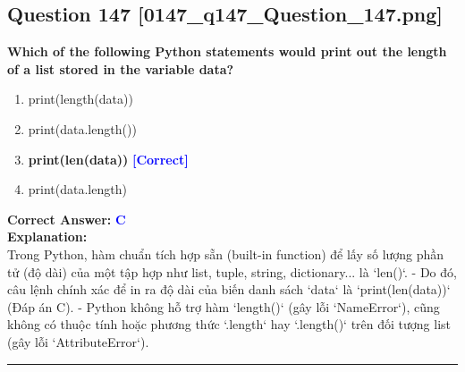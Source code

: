 \documentclass[11pt,a4paper]{article}
\begin{document}
\begin{minipage}{\textwidth}
\subsection*{Question 147 \quad \footnotesize{[0147_q147_Question_147.png]}}
\noindent \textbf{Which of the following Python statements would print out the length of a list stored in the variable data?}

\begin{enumerate}[label=\Alph*.]
    \item print(length(data))
    \item print(data.length())
    \item \textbf{print(len(data))} \hfill \textcolor{blue}{\textbf{[Correct]}}
    \item print(data.length)
\end{enumerate}

\noindent \textbf{Correct Answer:} \textcolor{blue}{\textbf{C}} \\[4pt]
\noindent \textbf{Explanation:}\\
Trong Python, hàm chuẩn tích hợp sẵn (built-in function) để lấy số lượng phần tử (độ dài) của một tập hợp như list, tuple, string, dictionary... là `len()`.\newline
- Do đó, câu lệnh chính xác để in ra độ dài của biến danh sách `data` là `print(len(data))` (Đáp án C).\newline
- Python không hỗ trợ hàm `length()` (gây lỗi `NameError`), cũng không có thuộc tính hoặc phương thức `.length` hay `.length()` trên đối tượng list (gây lỗi `AttributeError`).
\end{minipage}
\vspace{0.8cm}
\hrule
\vspace{0.5cm}
\end{document}
